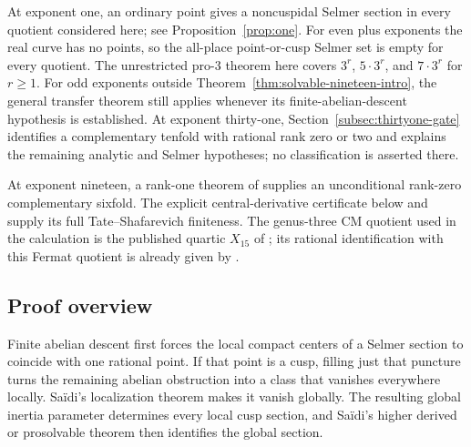 \documentclass[11pt]{article}
\theoremstyle{definition}
\begin{document}
At exponent one, an ordinary point gives a noncuspidal Selmer section
in every quotient considered here; see Proposition~\ref{prop:one}.
For even plus exponents the real curve has no points, so the all-place
point-or-cusp Selmer set is empty for every quotient. The unrestricted
pro-$3$ theorem here covers $3^r$, $5\cdot3^r$, and $7\cdot3^r$ for $r\ge1$.
For odd exponents
outside Theorem~\ref{thm:solvable-nineteen-intro}, the general transfer theorem still
applies whenever its finite-abelian-descent hypothesis is established.
At exponent thirty-one, Section~\ref{subsec:thirtyone-gate} identifies a
complementary tenfold with rational rank zero or two and explains the
remaining analytic and Selmer hypotheses; no classification is asserted there.

At exponent nineteen, a rank-one theorem of
\citet[Theorem~1.6(2), author p.~3]{McCallumTzermias2004} supplies
an unconditional rank-zero complementary sixfold. The explicit
central-derivative certificate below and
\citet[Theorem~A, p.~28]{Zhang2001} supply its full
Tate--Shafarevich finiteness. The genus-three CM quotient used in
the calculation is the published quartic $X_{15}$ of
\citet[author pp.~2 and 22; Table~1, case~15, p.~5]{KilicerEtAl2018};
its rational identification with this Fermat quotient is already given by
\citet[Remark~7.2, p.~12]{Tafazolian2026}.

\subsection{Proof overview}

Finite abelian descent first forces the local compact centers of a
Selmer section to coincide with one rational point. If that point is a
cusp, filling just that puncture turns the remaining abelian obstruction
into a class that vanishes everywhere locally. Sa\"idi's localization
theorem makes it vanish globally. The resulting global inertia
parameter determines every local cusp section, and Sa\"idi's higher
derived or prosolvable theorem then identifies the global section.
\end{document}
